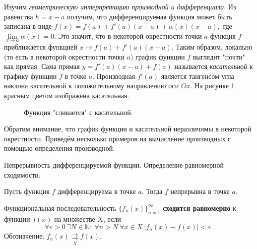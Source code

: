 Изучим
\emph{геометрическую интерпретацию производной
    и дифференциала}.
Из равенства $h=x-a$ получим, что дифференцируемая
функция может быть записана в виде $f(x)=f(a)+
    f'(a)(x-a)+\alpha(x)(x-a),$ где $\lim\limits_{
        x\rightarrow a}\alpha(x)=0.$ Это значит, что в
некоторой окрестности точки $a$ функция $f$
приближается функцией $x\mapsto f(a)+f'(a)(x-a).$
Таким образом, локально (то есть в некоторой
окрестности точки $a$) график функции $f$
выглядит "почти" как прямая. Сама прямая
$y=f'(a)(x-a)+f(a)$ называется
\emph{касательной} к графику функции $f$ в точке
$a.$ Производная $f'(a)$
является тангенсом угла наклона касательной
к положительному направлению оси $Ox.$
На рисунке 1 красным цветом изображена
касательная. \begin{figure}[h!]
    \caption{Функция "сливается" с касательной.}
    \label{fig:image}
\end{figure} Обратим внимание, что
график функции и касательной неразличимы
в некоторой окрестности.
Приведём несколько примеров на вычисление
производных с помощью определения производной.

\newpage
\begin{problem}
Непрерывность дифференцируемой функции. Определение равномерной сходимости.
\end{problem}

\begin{proposition}
    Пусть функция $f$ дифференцируема
    в точке $a.$ Тогда $f$ непрерывна в точке $a.$
\end{proposition}
\begin{definition}
Функциональная последовательность
$\{f_n(x)\}_{n = 1}^\infty$
\textbf{сходится равномерно} к функции $f(x)$
на множестве $X$, если
$$\forall \varepsilon > 0 \ \exists N
\in \mathbb N: \ \forall n > N \ \forall x \in X
\ |f_n(x) - f(x)| < \varepsilon.
$$
Обозначение: $f_n(x) \underset{X}\rightrightarrows f(x).$
\end{definition}

